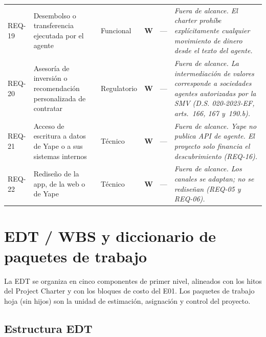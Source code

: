 \documentclass[11pt]{article}
\newcommand{\mos}[1]{\textbf{\textcolor{bcp}{#1}}}
\begin{document}
\begin{longtable}{@{}p{1.1cm} p{4.0cm} p{1.9cm} p{1.1cm} p{1.9cm} p{4.3cm}@{}}
REQ-19 & Desembolso o transferencia ejecutada por el agente & Funcional & \mos{W} & — & \textit{Fuera de alcance. El charter prohíbe explícitamente cualquier movimiento de dinero desde el texto del agente.} \\[0.3em]
REQ-20 & Asesoría de inversión o recomendación personalizada de contratar & Regulatorio & \mos{W} & — & \textit{Fuera de alcance. La intermediación de valores corresponde a sociedades agentes autorizadas por la SMV (D.S. 020-2023-EF, arts.~166, 167 y~190.b).} \\[0.3em]
REQ-21 & Acceso de escritura a datos de Yape o a sus sistemas internos & Técnico & \mos{W} & — & \textit{Fuera de alcance. Yape no publica API de agente. El proyecto solo financia el descubrimiento (REQ-16).} \\[0.3em]
REQ-22 & Rediseño de la app, de la web o de Yape & Técnico & \mos{W} & — & \textit{Fuera de alcance. Los canales se adaptan; no se rediseñan (REQ-05 y REQ-06).} \\
\end{longtable}

\section{EDT / WBS y diccionario de paquetes de trabajo}

La EDT se organiza en cinco componentes de primer nivel, alineados con los hitos del Project Charter y con los bloques de costo del E01. Los paquetes de trabajo hoja (sin hijos) son la unidad de estimación, asignación y control del proyecto.

\subsection{Estructura EDT}
\end{document}
